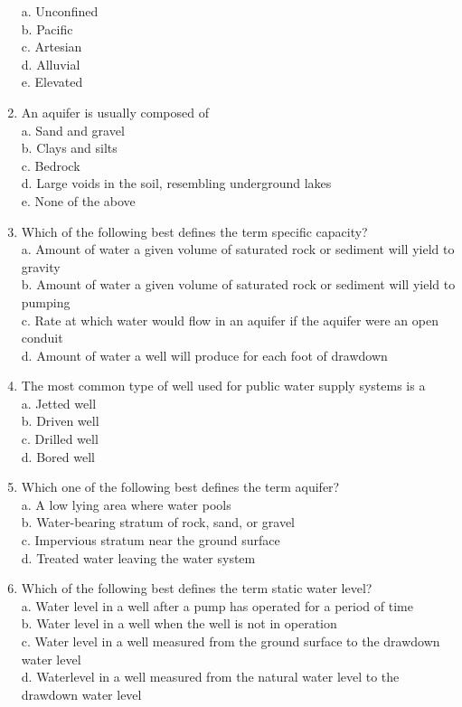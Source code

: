 \begin{enumerate}
a. Unconfined\\
b. Pacific\\
c. Artesian\\
d. Alluvial\\
e. Elevated\\
\item An aquifer is usually composed of\\
a. Sand and gravel\\
b. Clays and silts\\
c. Bedrock\\
d. Large voids in the soil, resembling underground lakes\\
e. None of the above\\
\item Which of the following best defines the term specific capacity?\\
a. Amount of water a given volume of saturated rock or sediment will yield to gravity\\
b. Amount of water a given volume of saturated rock or sediment will yield to pumping\\
c. Rate at which water would flow in an aquifer if the aquifer were an open conduit\\
d. Amount of water a well will produce for each foot of drawdown\\
\item The most common type of well used for public water supply systems is a\\
a. Jetted well\\
b. Driven well\\
c. Drilled well\\
d. Bored well 

\item Which one of the following best defines the term aquifer?\\
a. A low lying area where water pools\\
b. Water-bearing stratum of rock, sand, or gravel\\
c. Impervious stratum near the ground surface\\
d. Treated water leaving the water system\\

\item Which of the following best defines the term static water level?\\
a. Water level in a well after a pump has operated for a period of time\\
b. Water level in a well when the well is not in operation\\
c. Water level in a well measured from the ground surface to the drawdown water level\\
d. Waterlevel in a well measured from the natural water level to the drawdown water level\\


\end{enumerate}
